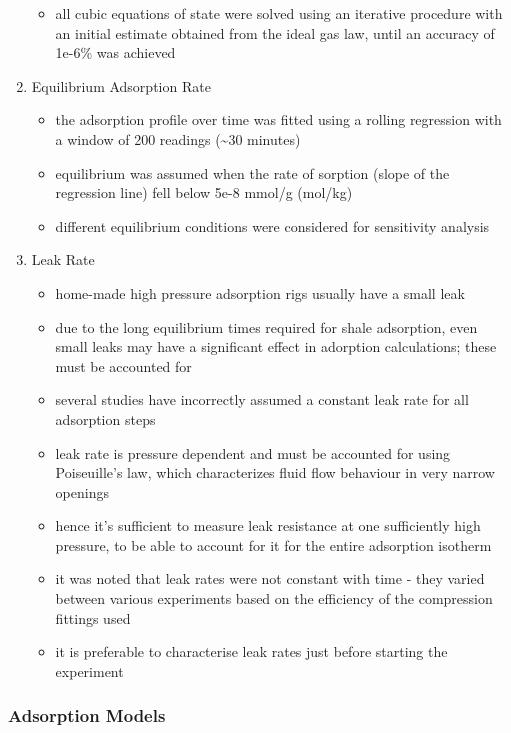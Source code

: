 \documentclass[11pt]{article}
\begin{document}
\begin{enumerate}
\begin{equation}
\end{equation}
\begin{itemize}
\item all cubic equations of state were solved using an iterative procedure with an initial estimate obtained from the ideal gas law, until an accuracy of 1e-6\% was achieved
\end{itemize}
\item Equilibrium Adsorption Rate
\label{sec:org207a86b}
\begin{itemize}
\item the adsorption profile over time was fitted using a rolling regression with a window of 200 readings (\textasciitilde{}30 minutes)
\item equilibrium was assumed when the rate of sorption (slope of the regression line) fell below 5e-8 mmol/g (mol/kg)
\item different equilibrium conditions were considered for sensitivity analysis
\end{itemize}
\item Leak Rate
\label{sec:org096bf08}
\begin{itemize}
\item home-made high pressure adsorption rigs usually have a small leak
\item due to the long equilibrium times required for shale adsorption, even small leaks may have a significant effect in adorption calculations; these must be accounted for
\item several studies have incorrectly assumed a constant leak rate for all adsorption steps
\item leak rate is pressure dependent and must be accounted for using Poiseuille's law, which characterizes fluid flow behaviour in very narrow openings
\item hence it's sufficient to measure leak resistance at one sufficiently high pressure, to be able to account for it for the entire adsorption isotherm
\item it was noted that leak rates were not constant with time - they varied between various experiments based on the efficiency of the compression fittings used
\item it is preferable to characterise leak rates just before starting the experiment
\end{itemize}
\end{enumerate}
\subsubsection{Adsorption Models}
\label{sec:org44c4e41}
\end{document}
